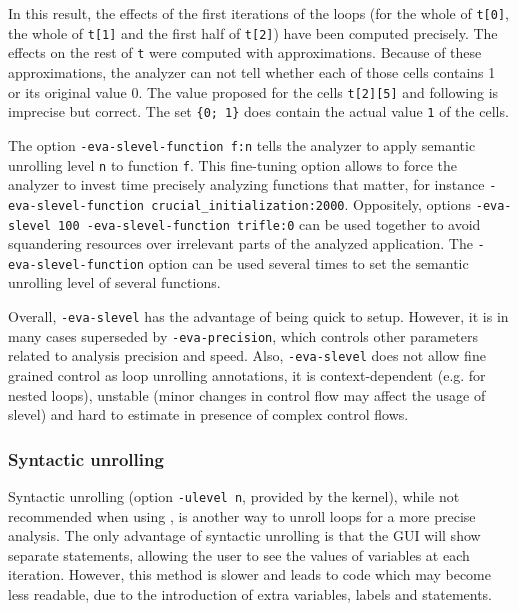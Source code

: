 \documentclass{frama-c-book}
\begin{document}
In this result, the effects of the first iterations of the loops
(for the whole of \lstinline|t[0]|, the whole of \lstinline|t[1]| and the first
half of \lstinline|t[2]|) have been computed precisely. The
effects on the rest of \lstinline|t| were computed with
approximations. Because of these approximations, the analyzer can not
tell whether each of those cells contains 1 or its original value 0.
The value proposed for the cells \lstinline|t[2][5]| and following
is imprecise but correct. The set \lstinline|{0; 1}| does
contain the actual value \lstinline|1| of the cells.

The option \lstinline|-eva-slevel-function f:n| tells the analyzer to apply
semantic unrolling level \lstinline|n| to function \lstinline|f|.
This fine-tuning option allows to
force the analyzer to invest time precisely analyzing functions that matter,
for instance \lstinline|-eva-slevel-function crucial_initialization:2000|.
Oppositely, options \lstinline|-eva-slevel 100 -eva-slevel-function trifle:0|
can be used together to avoid squandering resources over irrelevant parts of
the analyzed application. The \lstinline|-eva-slevel-function| option can be used
several times to set the semantic unrolling level of several functions.

Overall, \lstinline|-eva-slevel| has the advantage of being quick to setup.
However, it is in many cases superseded by \lstinline|-eva-precision|, which
controls other parameters related to analysis precision and speed.
Also, \lstinline|-eva-slevel| does not allow fine grained control as
loop unrolling annotations,
it is context-dependent (e.g. for nested loops), unstable (minor changes in
control flow may affect the usage of slevel) and hard to estimate in presence
of complex control flows.

\subsubsection{Syntactic unrolling}

Syntactic unrolling (option \lstinline|-ulevel n|, provided by the \FramaC
kernel), while not recommended when using \Eva{}, is another way to unroll
loops for a more precise analysis. The only advantage of syntactic unrolling
is that the GUI will show separate statements, allowing
the user to see the values of variables at each iteration.
However, this method is slower and leads to code which may become less
readable, due to the introduction of extra variables, labels and statements.
\end{document}
